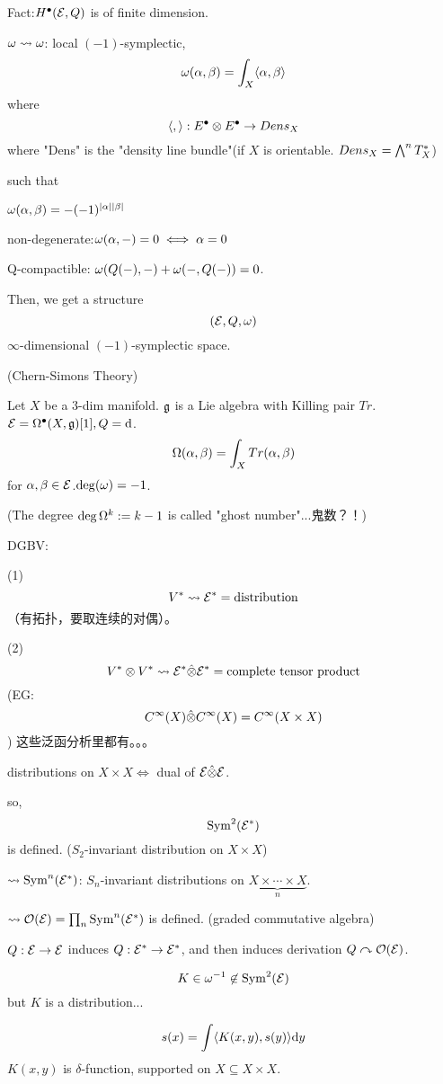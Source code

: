 Fact:$H^{\bullet}(\mathcal{E},Q)$ is of finite dimension.

$\omega\rightsquigarrow\omega$: local $(-1)$-symplectic,
$$\omega(\alpha,\beta)=\int_X\langle\alpha,\beta\rangle$$
where
$$\langle,\rangle: E^{\bullet}\otimes E^{\bullet}\to Dens_X$$
where "Dens" is the "density line bundle"(if $X$ is orientable. $Dens_X=\bigwedge\nolimits^{n}T_X^*$)

such that

$\omega(\alpha,\beta)=-(-1)^{|\alpha||\beta|}$

non-degenerate:$\omega(\alpha,-)=0\iff\alpha=0$

Q-compactible:
$\omega(Q(-),-)+\omega(-,Q(-))=0$.

Then, we get a structure
$$(\mathcal{E},Q,\omega)$$
$\infty$-dimensional $(-1)$-symplectic space.

\begin{example}(Chern-Simons Theory)

Let $X$ be a $3$-dim manifold. $\mathfrak{g}$ is a Lie algebra
with Killing pair $Tr$. $\mathcal{E}=\Omega^{\bullet}(X,\mathfrak{g})[1],Q=\mathrm{d}$.
$$\Omega(\alpha,\beta)=\int_XTr(\alpha,\beta)$$
for $\alpha,\beta\in\mathcal{E}$.$\deg(\omega)=-1$.
\end{example}
(The degree $\deg\Omega^k:=k-1$ is called "ghost number"...鬼数？！)

DGBV:

(1)
$$V^*\rightsquigarrow\mathcal{E}^*=\text{distribution}$$
（有拓扑，要取连续的对偶）。

(2)
$$V^*\otimes V^*\rightsquigarrow\mathcal{E}^*\hat{\otimes}\mathcal{E}^*=\text{complete tensor product}$$
(EG:$$C^\infty(X)\hat{\otimes}C^\infty(X)=C^{\infty}(X\times X)$$
)
这些泛函分析里都有。。。

distributions on $X\times X\iff$ dual of $\mathcal{E}\hat{\otimes}\mathcal{E}$.

so,
$$\operatorname{Sym}^2(\mathcal{E}^*)$$
is defined.
($S_2$-invariant distribution on $X\times X$)

$\rightsquigarrow\operatorname{Sym}^n(\mathcal{E}^*)$: $S_n$-invariant distributions on
$\underbrace{X\times\cdots\times X}_n$.

$\rightsquigarrow\mathcal{O}(\mathcal{E})=\prod_n\operatorname{Sym}^n(\mathcal{E}^*)$ is defined.
(graded commutative algebra)

$Q:\mathcal{E}\to\mathcal{E}$ induces $Q:\mathcal{E}^*\to\mathcal{E}^*$, and then
induces derivation $Q\curvearrowright\mathcal{O}(\mathcal{E})$.

$$K\in\omega^{-1}\not\in\operatorname{Sym}^2(\mathcal{E})$$
but $K$ is a distribution...

$$s(x)=\int\langle K(x,y),s(y)\rangle\mathrm{d} y$$
$K(x,y)$ is $\delta$-function, supported on $X\subseteq X\times X$.


